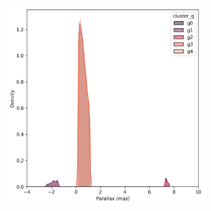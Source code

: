 \documentclass[preprint,12pt,authoryear]{elsarticle}
\begin{document}
\begin{figure}[!hbt]
\begin{subfigure}{0.29\textwidth}
  \end{subfigure}
  \begin{subfigure}{0.29\textwidth}
    \includegraphics[width=\textwidth]{../figures/melotte_22/dec_parallax_filtered_melotte_22.png}
  \end{subfigure}


\end{figure}
\end{document}
